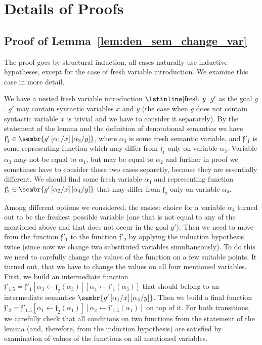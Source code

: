 \clearpage

\section{Details of Proofs}
\label{appendix_proofs}

\subsection{Proof of Lemma~\ref{lem:den_sem_change_var}}
\label{appendix_den_sem_change_var_proof}

The proof goes by structural induction, all cases naturally use inductive hypotheses, except for the case of fresh variable introduction. We examine this case in more detail.

We have a nested fresh variable introduction $\mbox{\lstinline|fresh|}\,y\,.\,g'$ as the goal $g$. $g'$ may contain syntactic variables $x$ and $y$ (the case when $g$ does not contain syntactic variable $x$ is trivial and we have to consider it separately). By the statement of the lemma and the definition of denotational semantics we have ${\mathfrak f'_1} \in \sembr{g'\,[\alpha_1/x]\,[\alpha_3/y]}$, where $\alpha_3$ is some fresh semantic variable, and ${\mathfrak f'_1}$ is some representing function which may differ from ${\mathfrak f_1}$ only on variable $\alpha_3$. Variable $\alpha_3$ may not be equal to $\alpha_1$, but may be equal to $\alpha_2$ and further in proof we sometimes have to consider these two cases separetly, because they are essentially different. We should find some fresh variable $\alpha_4$ and representing function ${\mathfrak f'_2} \in \sembr{g'\,[\alpha_2/x]\,[\alpha_4/y]}$ that may differ from ${\mathfrak f_2}$ only on variable $\alpha_4$.

Among different options we considered, the easiest choice for a variable $\alpha_4$ turned out to be the freshest possible variable (one that is not equal to any of the mentioned above and that does not occur in the goal $g'$). Then we need to move from the function ${\mathfrak f'_1}$ to the function ${\mathfrak f'_2}$ by applying the induction hypothesis twice (since now we change two substituted variables simultaneously). To do this we need to carefully change the values of the function on a few suitable points. It turned out, that we have to change the values on all four mentioned variables. First, we build an intermediate function ${\mathfrak f'_{1.5}} = {\mathfrak f'_1}[\alpha_3\gets {\mathfrak f_2}(\alpha_3)][\alpha_4\gets {\mathfrak f'_1}(\alpha_3)]$ that should belong to an intermediate semantics $\sembr{g'\,[\alpha_1/x]\,[\alpha_4/y]}$. Then we build a final function ${\mathfrak f'_2} = {\mathfrak f'_{1.5}}[\alpha_1\gets {\mathfrak f_2}(\alpha_1)][\alpha_2\gets {\mathfrak f'_{1.5}}(\alpha_1)]$ on top of it. For both transitions, we carefully check that all conditions on two functions from the statement of the lemma (and, therefore, from the induction hypothesis) are satisfied by examination of values of the functions on all mentioned variables.

